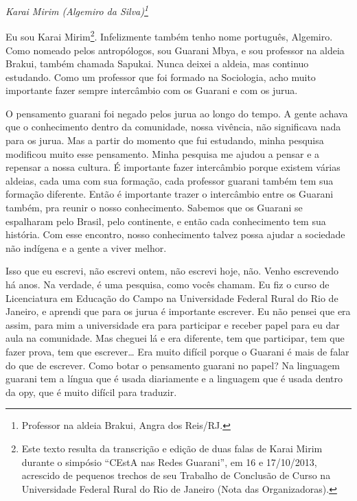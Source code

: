 \begin{flushright}
\emph{Karai Mirim (Algemiro da Silva)\footnote{Professor na aldeia Brakui,
Angra dos Reis/RJ.}}
\end{flushright} 

Eu sou Karai Mirim\footnote{Este texto resulta da transcrição e edição
de duas falas de Karai Mirim durante o simpósio ``CEstA nas Redes
Guarani'', em 16 e 17/10/2013, acrescido de pequenos trechos de seu
Trabalho de Conclusão de Curso na Universidade Federal Rural do Rio de
Janeiro (Nota das Organizadoras).}. Infelizmente também tenho nome
português, Algemiro. Como nomeado pelos antropólogos, sou Guarani Mbya,
e sou professor na aldeia Brakui, também chamada Sapukai. Nunca deixei
a aldeia, mas continuo estudando. Como um professor que foi formado na
Sociologia, acho muito importante fazer sempre intercâmbio com os
Guarani e com os jurua.

O pensamento guarani foi negado pelos jurua ao longo do tempo. A gente
achava que o conhecimento dentro da comunidade, nossa vivência, não
significava nada para os jurua. Mas a partir do momento que fui
estudando, minha pesquisa modificou muito esse pensamento. Minha
pesquisa me ajudou a pensar e a repensar a nossa cultura. É importante
fazer intercâmbio porque existem várias aldeias, cada uma com sua
formação, cada professor guarani também tem sua formação diferente.
Então é importante trazer o intercâmbio entre os Guarani também, pra
reunir o nosso conhecimento. Sabemos que os Guarani se espalharam pelo
Brasil, pelo continente, e então cada conhecimento tem sua história.
Com esse encontro, nosso conhecimento talvez possa ajudar a sociedade
não indígena e a gente a viver melhor.

Isso que eu escrevi, não escrevi ontem, não escrevi hoje, não. Venho
escrevendo há anos. Na verdade, é uma pesquisa, como vocês chamam. Eu
fiz o curso de Licenciatura em Educação do Campo na Universidade
Federal Rural do Rio de Janeiro, e aprendi que para os jurua é
importante escrever. Eu não pensei que era assim, para mim a
universidade era para participar e receber papel para eu dar aula na
comunidade. Mas cheguei lá e era diferente, tem que participar, tem que
fazer prova, tem que escrever\ldots{} Era muito difícil porque o Guarani é
mais de falar do que de escrever. Como botar o pensamento guarani no
papel? Na linguagem guarani tem a língua que é usada diariamente e a
linguagem que é usada dentro da opy, que é muito difícil para traduzir.

